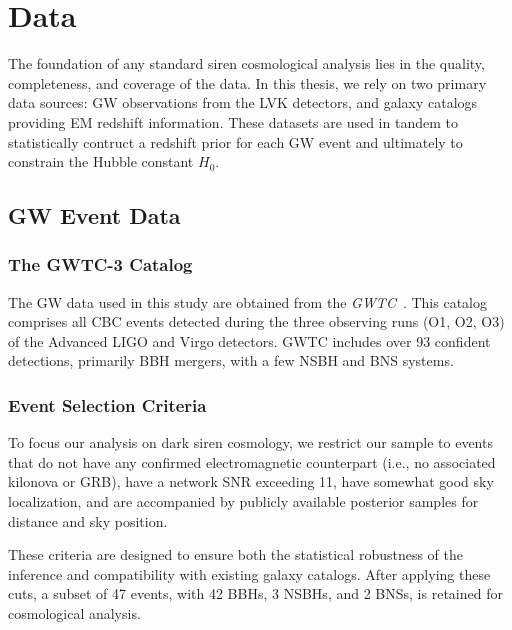 \chapter{Data}
\label{chap:data}


The foundation of any standard siren cosmological analysis lies in the quality, completeness, and coverage of the data. In this thesis, we rely on two primary data sources: \ac{GW} observations from the \ac{LVK} detectors, and galaxy catalogs providing \ac{EM} redshift information. These datasets are used in tandem to statistically contruct a redshift prior for each \ac{GW} event and ultimately to constrain the Hubble constant $H_0$.

\section{\ac{GW} Event Data}

\subsection{The GWTC-3 Catalog}

The \ac{GW} data used in this study are obtained from the \textit{\ac{GWTC}}~\citep{abbott201gwtc1, abbott2021gwtc2, abbott2024gwtc21, abbott2023gwtc3}. This catalog comprises all \ac{CBC} events detected during the three observing runs (O1, O2, O3) of the Advanced LIGO and Virgo detectors. \ac{GWTC} includes over 93 confident detections, primarily \ac{BBH} mergers, with a few \ac{NSBH} and \ac{BNS} systems.

%
\subsection{Event Selection Criteria}

To focus our analysis on dark siren cosmology, we restrict our sample to events that do not have any confirmed electromagnetic counterpart (i.e., no associated kilonova or GRB), have a network \ac{SNR} exceeding 11, have somewhat good sky localization, and are accompanied by publicly available posterior samples for distance and sky position.

These criteria are designed to ensure both the statistical robustness of the inference and compatibility with existing galaxy catalogs. After applying these cuts, a subset of 47 events, with 42 \acp{BBH}, 3
\acp{NSBH}, and 2 \acp{BNS}, is retained for cosmological analysis.

